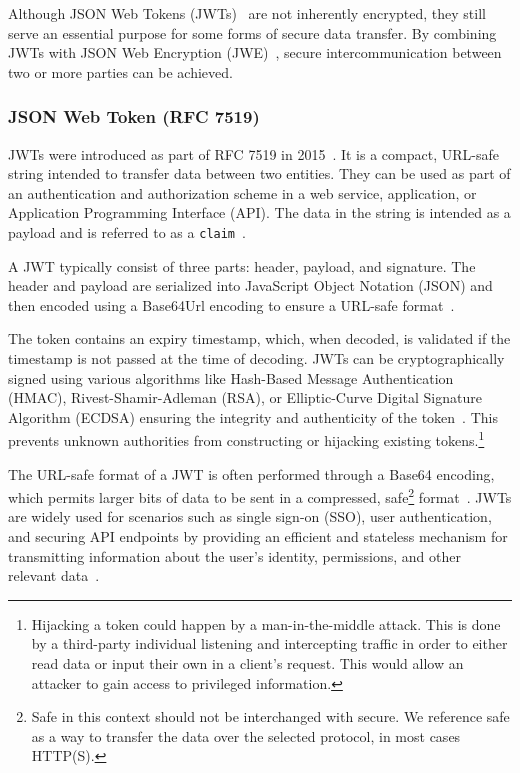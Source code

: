 Although JSON Web Tokens (JWTs)~\cite{RFC7519} are not inherently encrypted,
they still serve an essential purpose for some forms of secure data transfer.
By combining JWTs with JSON Web Encryption (JWE)~\cite{rfc7516}, secure
intercommunication between two or more parties can be achieved.

\subsubsection{JSON Web Token (RFC 7519)}
JWTs were introduced as part of RFC 7519 in 2015~\cite{RFC7519}.
It is a compact, URL-safe string intended to transfer data between two entities.
They can be used as part of an authentication and authorization scheme in a web
service, application, or Application Programming Interface (API)\@.
The data in the string is intended as a payload and is referred to as a
\texttt{claim}~\cite{RFC7519}.

A JWT typically consist of three parts: header, payload, and signature.
The header and payload are serialized into JavaScript Object Notation (JSON)
and then encoded using a Base64Url encoding to ensure a URL-safe
format~\cite{RFC7519}.

The token contains an expiry timestamp, which, when decoded, is validated if
the timestamp is not passed at the time of decoding.
JWTs can be cryptographically signed using various algorithms like Hash-Based
Message Authentication (HMAC), Rivest-Shamir-Adleman (RSA), or
Elliptic-Curve Digital Signature Algorithm (ECDSA) ensuring the integrity and
authenticity of the token~\cite{RFC7519}.
This prevents unknown authorities from constructing or hijacking existing
tokens.\footnote{
  Hijacking a token could happen by a man-in-the-middle attack.
  This is done by a third-party individual listening and intercepting traffic
  in order to either read data or input their own in a client's request.
  This would allow an attacker to gain access to privileged information.
}

The URL-safe format of a JWT is often performed through a Base64 encoding, which
permits larger bits of data to be sent in a compressed, safe\footnote{
  Safe in this context should not be interchanged with secure.
  We reference safe as a way to transfer the data over the selected protocol,
  in most cases HTTP(S).
} format~\cite{RFC7519}.
JWTs are widely used for scenarios such as single sign-on (SSO), user
authentication, and securing API endpoints by providing an efficient and
stateless mechanism for transmitting information about the user's identity,
permissions, and other relevant data~\cite{karande2018securingnode}.

